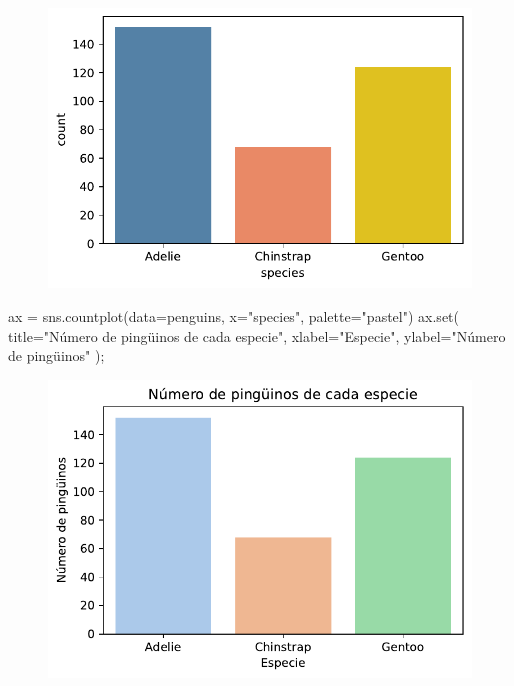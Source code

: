 \documentclass[
  a4paper,
  noprof,
  12pt,
  notoc,
  nosols,
  nobib]{mnye}
\newenvironment{Shaded}{\begin{snugshade}}{\end{snugshade}}
\newcommand{\BuiltInTok}[1]{\textcolor[rgb]{0.00,0.23,0.31}{#1}}
\newcommand{\NormalTok}[1]{\textcolor[rgb]{0.00,0.23,0.31}{#1}}
\newcommand{\OperatorTok}[1]{\textcolor[rgb]{0.37,0.37,0.37}{#1}}
\newcommand{\StringTok}[1]{\textcolor[rgb]{0.13,0.47,0.30}{#1}}
\theoremstyle{definition}
\theoremstyle{remark}
\begin{document}
\begin{figure}[tbph]

{\centering \includegraphics{chapters/1categorical_files/figure-pdf/cell-18-output-1.pdf}

}

\end{figure}

\begin{Shaded}
\begin{Highlighting}[]
\NormalTok{ax }\OperatorTok{=}\NormalTok{ sns.countplot(data}\OperatorTok{=}\NormalTok{penguins, x}\OperatorTok{=}\StringTok{"species"}\NormalTok{, palette}\OperatorTok{=}\StringTok{"pastel"}\NormalTok{)}
\NormalTok{ax.}\BuiltInTok{set}\NormalTok{(}
\NormalTok{    title}\OperatorTok{=}\StringTok{"Número de pingüinos de cada especie"}\NormalTok{,}
\NormalTok{    xlabel}\OperatorTok{=}\StringTok{"Especie"}\NormalTok{, }
\NormalTok{    ylabel}\OperatorTok{=}\StringTok{"Número de pingüinos"}
\NormalTok{)}\OperatorTok{;}
\end{Highlighting}
\end{Shaded}

\begin{figure}[tbph]

{\centering \includegraphics{chapters/1categorical_files/figure-pdf/cell-19-output-1.pdf}

}

\end{figure}
\end{document}

